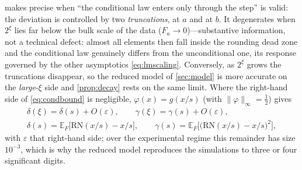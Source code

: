 \documentclass[review,hidelinks,oneeqnum,onetabnum,onefignum,onethmnum]{siamart251216}
\begin{document}
\begin{remark}
 makes precise when ``the conditional law enters only through
the step'' is valid: the deviation is controlled by two \emph{truncations}, at
$a$ and at $b$. It degenerates when $2^\xi$ lies far below the bulk scale of the
data ($F_a\to0$)---substantive information, not a technical defect: almost all
elements then fall inside the rounding dead zone and the conditional law
genuinely differs from the unconditional one, its response governed by the other
asymptotics \cref{eq:lmscaling}. Conversely, as $2^\xi$ grows the truncations
disappear, so the reduced model of \cref{sec:model} is more accurate on the
\emph{large}-$\xi$ side and \cref{prop:decay} rests on the same limit. Where the
right-hand side of \cref{eq:condbound} is negligible, $\varphi(x)=g(x/s)$ (with
$\|\varphi\|_\infty=\tfrac12$) gives
\begin{equation}
\begin{gathered}
\delta(\xi)=\delta(s)+O(\varepsilon),\qquad
\gamma(\xi)=\gamma(s)+O(\varepsilon),\\[2pt]
\delta(s)=\mathbb E_F\bigl[\mathrm{RN}(x/s)-x/s\bigr],\qquad
\gamma(s)=\mathbb E_F\bigl[\bigl(\mathrm{RN}(x/s)-x/s\bigr)^2\bigr],
\end{gathered}
\label{eq:deltagamma}
\end{equation}
with $\varepsilon$ that right-hand side; over the experimental regime this
remainder has size $10^{-3}$, which is why the reduced model reproduces the
simulations to three or four significant digits.
\end{remark}
\end{document}

